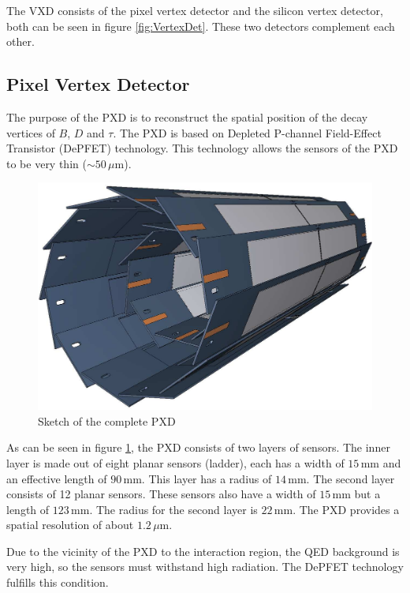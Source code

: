 \documentclass[a4paper,11pt,twosided,final,german,openbib,pdftex,listof=totoc,bibliography=totoc]{scrbook}
\begin{document}
The VXD consists of the pixel vertex detector and the silicon vertex detector, both can be seen in figure \ref{fig:VertexDet}. These two detectors complement each other.


\subsection{Pixel Vertex Detector}
\label{sec:Pixel}
The purpose of the PXD is to reconstruct the spatial position of the decay vertices of $B$, $D$ and $\tau$.
The PXD is based on Depleted P-channel Field-Effect Transistor (DePFET) technology. This technology allows the sensors of the PXD to be very thin ($\sim 50\,\mu\textrm{m}$).

\begin{figure}[h!]
	\begin{center}
		\includegraphics[width=12cm]{Bilder/pixel}
	\end{center}
	\caption[Pixel Detector]{Sketch of the complete PXD \cite{B2TR}}
	\label{fig:pxd}
\end{figure}

As can be seen in figure \ref{fig:pxd}, the PXD consists of two layers of sensors. The inner layer is made out of eight planar sensors (ladder), each has a width of $15\,\textrm{mm}$ and an effective length of $90\,\textrm{mm}$. This layer has a radius of $14\,\textrm{mm}$. The second layer consists of 12 planar sensors. These sensors also have a width of $15\,\textrm{mm}$ but a length of $123\,\textrm{mm}$. The radius for the second layer is $22\,\textrm{mm}$. The PXD provides a spatial resolution of about $1.2\,\mu\textrm{m}$.\cite{B2TR}

Due to the vicinity of the PXD to the interaction region, the QED background is very high, so the sensors must withstand high radiation. The DePFET technology fulfills this condition. \cite{B2TR} \cite{MARINAS201159}
\newline 
\end{document}
